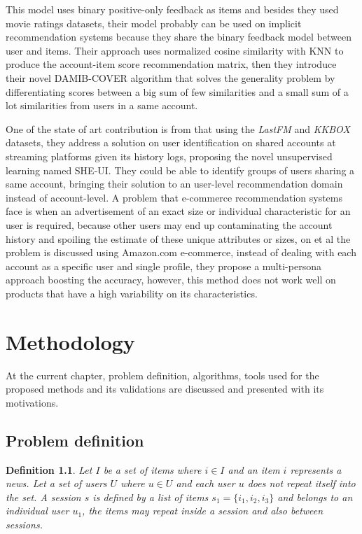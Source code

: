 \documentclass[ecp,tc,english]{iiufrgs}
\newtheorem{definition}{Definition}
\begin{document}
This model uses binary positive-only feedback as items and besides they used movie ratings datasets, their model probably can be used on implicit recommendation systems because they share the binary feedback model between user and items.
Their approach uses normalized cosine similarity with KNN \cite{oro28327} to produce the account-item score recommendation matrix, then they introduce their novel DAMIB-COVER algorithm that solves the generality problem by differentiating scores between a big sum of few similarities and a small sum of a lot similarities from users in a same account.

One of the state of art contribution is from \cite{Jiang:2018:IUB:3209978.3210054} that using the \textit{LastFM} and \textit{KKBOX} datasets, they address a solution on user identification on shared accounts at streaming platforms given its history logs, proposing the novel unsupervised learning named SHE-UI. They could be able to identify groups of users sharing a same account, bringing their solution to an user-level recommendation domain instead of account-level.
A problem that e-commerce recommendation systems face is when an advertisement of an exact size or individual characteristic for an user is required, because other users may end up contaminating the account history and spoiling the estimate of these unique attributes or sizes, on \cite{10.1145/3178876.3186149} et al the problem is discussed using Amazon.com e-commerce, instead of dealing with each account as a specific user and single profile, they propose a multi-persona approach boosting the accuracy, however, this method does not work well on products that have a high variability on its characteristics.





\chapter{Methodology}
At the current chapter, problem definition, algorithms, tools used for the proposed methods and its validations are discussed and presented with its motivations.

    \section{Problem definition}
    \begin{definition}
    Let \(I \) be a set of items where \(i \in I \) and an item \(i\) represents a news. Let a set of users \(U\) where \(u \in U \) and each user \(u\) does not repeat itself into the set.
    A session \(s\) is defined by a list of items \(s_{1} = \{i_{1}, i_{2}, i_{3}\}\) and belongs to an individual user \(u_{1}\), the items may repeat inside a session and also between sessions.
    \end{definition}
    
\end{document}
